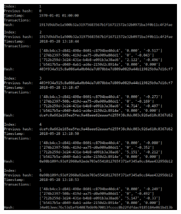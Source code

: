 \begin{figure}
\centering
\begin{subfigure}[!htb]{1\textwidth}
  \includegraphics[width=1\linewidth]{Images/tx_1}
\end{subfigure}
\end{figure}
